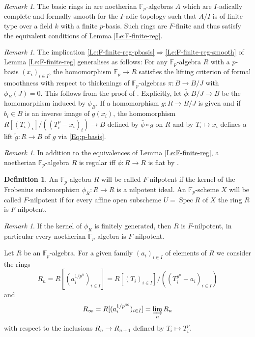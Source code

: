 \documentclass[a4paper,11pt]{article}
\theoremstyle{plain}
\theoremstyle{definition}
\newtheorem{Defn}[Lemma]{Definition}
\theoremstyle{remark}
\newtheorem{Remark}[Lemma]{Remark}
\theoremstyle{definition}
\numberwithin{Lemma}{section}
\numberwithin{Subpoint}{Lemma}
\numberwithin{equation}{section}
\newcommand{\FF}{{\mathbb{F}}}
\DeclareMathOperator{\Spec}{Spec}
\newcommand{\chang}[1]{{#1}}
\begin{document}
\begin{Remark}
\label{Rk:Rings-dJ}
The basic rings in \cite[1.3.1]{Jong:Crystalline} are noetherian 
$\FF_p$-algebras $A$ which are $I$-adically complete and formally
smooth for the $I$-adic topology such that $A/I$ is of finite type
over a field $k$ with a finite $p$-basis. Such rings are $F$-finite
and thus satisfy the equivalent conditions of Lemma \ref{Le:F-finite-reg}.
\end{Remark}

\begin{Remark}
\label{Re:p-basis-formally-smooth}
\chang{The implication \eqref{Le:F-finite-reg-pbasis}$\Rightarrow$\eqref{Le:F-finite-reg-smooth} of Lemma \ref{Le:F-finite-reg} generalises as follows:
For any $\FF_p$-algebra $R$ with a $p$-basis $(x_i)_{i\in I}$, the homomorphism $\FF_p\to R$ satisfies the lifting criterion of formal smoothness with respect to thickenings of $\FF_p$-algebras $\pi:B\to B/J$ with $\phi_B(J)=0$. This follows from the proof of \cite[$0_{\,\rm IV}$ (21.2.7)]{EGA}. Explicitly, let $\bar\phi:B/J\to B$ be the homomorphism induced by $\phi_B$.
If a homomorphism $g:R\to B/J$ is given and if $b_i\in B$ is an inverse image of $g(x_i)$, the homomorphism $R[(T_i)_i]/((T_i^p-x_i)_i)\to B$ defined by $\bar\phi\circ g$ on $R$ and by $T_i\mapsto x_i$ defines a lift $\tilde g:R\to B$ of $g$ via \eqref{Eq:p-basis}.}
\end{Remark}

\begin{Remark}
\chang{In addition to the equivalences of Lemma \ref{Le:F-finite-reg},}
a noetherian $\FF_p$-algebra $R$ is regular 
iff $\phi:R\to R$ is flat by \cite[Thm.~2.1]{Kunz:Regular}. 
\end{Remark}

\begin{Defn}
\label{Def:F-nilp}
An $\FF_p$-algebra $R$ will be called $F$-nilpotent
if the kernel of the Frobenius endomorphism $\phi_R:R\to R$
is a nilpotent ideal. 
An $\FF_p$-scheme $X$ \chang{will be} called $F$-nilpotent if 
for \chang{every} affine open subscheme $U=\Spec R$ of $X$ the ring $R$ is $F$-nilpotent.
\end{Defn}

\begin{Remark}
If the kernel of $\phi_R$ is finitely generated, then $R$ is $F$-nilpotent,
in particular every noetherian $\FF_p$-algebra is $F$-nilpotent.
\end{Remark}

Let $R$ be an $\FF_p$-algebra.
For a given family $(a_i)_{i\in I}$ of elements of $R$ we consider
the rings
\begin{equation}
\label{Eq:Rapn}
R_n=R[(a_i^{1/p^n})_{i\in I}]=R[(T_i)_{i\in I}]/((T_i^{p^n}-a_i)_{i\in I})
\end{equation}
and
\begin{equation}
\label{Eq:Rapinf}
R_\infty=R[(a_i^{1/p^\infty})_{i\in I}]=\varinjlim_nR_n
\end{equation}
with respect to the inclusions $R_n\to R_{n+1}$ defined by $T_i\mapsto T_i^p$.
\end{document}
